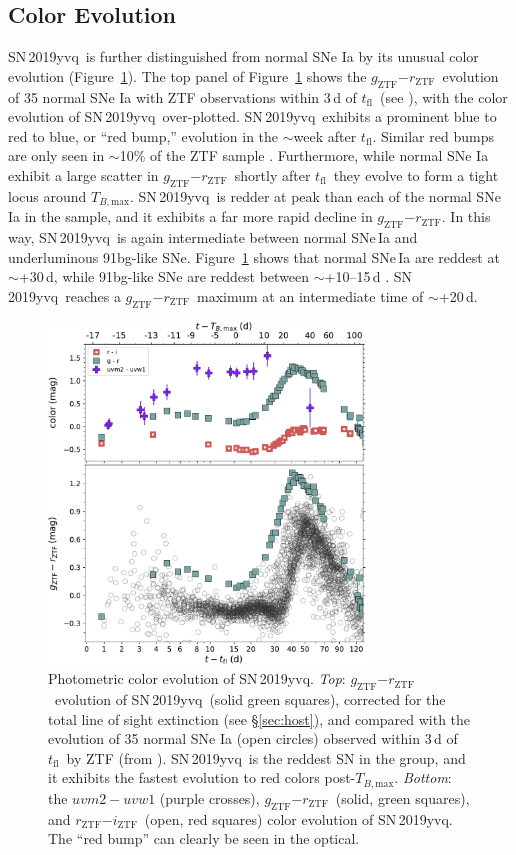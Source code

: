 \documentclass[twocolumn]{aastex63}
\newcommand{\rztf}{$r_\mathrm{ZTF}$}
\newcommand{\gztf}{$g_\mathrm{ZTF}$}
\newcommand{\iztf}{$i_\mathrm{ZTF}$}
\newcommand{\tfl}{$t_\mathrm{fl}$}
\newcommand{\tbmax}{$T_{B,\mathrm{max}}$}
\newcommand{\sn}{SN\,2019yvq}
\begin{document}
\subsection{Color Evolution}

\sn\ is further distinguished from normal SNe Ia by its unusual color
evolution (Figure~\ref{fig:colors}). The top panel of Figure~\ref{fig:colors}
shows the \gztf$ - $\rztf\ evolution of 35 normal SNe Ia with ZTF observations
within 3\,d of \tfl\ (see \citealt{Bulla20}), with the color evolution of \sn\
over-plotted. \sn\ exhibits a prominent blue to red to blue, or ``red bump,''
evolution in the $\sim$week after \tfl. Similar red bumps are only seen in
$\sim$10\% of the ZTF sample \citep{Bulla20}. Furthermore, while normal SNe Ia
exhibit a large scatter in \gztf$ - $\rztf\ shortly after \tfl\ they evolve to
form a tight locus around \tbmax. \sn\ is redder at peak than each of the
normal SNe Ia in the \citet{Bulla20} sample, and it exhibits a far more rapid
decline in \gztf$ - $\rztf. In this way, \sn\ is again intermediate between
normal SNe\,Ia and underluminous 91bg-like SNe. Figure~\ref{fig:colors} shows
that normal SNe\,Ia are reddest at $\sim$+30\,d, while 91bg-like SNe are
reddest between $\sim$+10--15\,d \citet{Burns14}. \sn\ reaches a
\gztf$-$\rztf\ maximum at an intermediate time of $\sim$+20\,d.

\begin{figure}
    \centering
    \includegraphics[width=3.35in]{./figures/P48_colors.pdf}
    \caption{Photometric color evolution of \sn. \textit{Top}: \gztf$ -
    $\rztf\ evolution of \sn\ (solid green squares), corrected for the total
    line of sight extinction (see \S\ref{sec:host}), and compared with the
    evolution of 35 normal SNe Ia (open circles) observed within 3\,d of \tfl\
    by ZTF (from \citealt{Bulla20}). \sn\ is the reddest SN in the group, and
    it exhibits the fastest evolution to red colors post-\tbmax.
    \textit{Bottom}: the $uvm2 - uvw1$ (purple crosses), \gztf$ - $\rztf\
    (solid, green squares), and \rztf$ - $\iztf\ (open, red squares) color
    evolution of \sn. The ``red bump'' can clearly be seen in the optical.}
    \label{fig:colors}
\end{figure}
\end{document}

